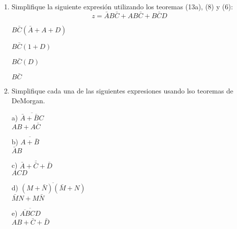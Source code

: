 \documentclass[a4paper, 12pt]{article}
\newcommand{\Aspace}{0.2cm}
\begin{document}
\begin{enumerate}
        
        \item Simplifique la siguiente expresión utilizando los teoremas (13a), (8) y (6):
        \[ z = \bar{A}B\bar{C} + AB\bar{C} + B\bar{C}D \]
            \par
            { \color{azul} 
                        $B\bar{C}(\bar{A} + A + D)$
                \par    $B\bar{C}(1 + D)$
                \par    $B\bar{C}(D)$
                \par    $B\bar{C}$
            }



        \item Simplifique cada una de las siguientes expresiones usando lso teoremas de DeMorgan.
            \vspace{\Aspace} \par
            a) $\overline{\bar{A} + \bar{B}C}$
            \\ { \color{azul} $AB + A\bar{C}$ }

            \vspace{\Aspace} \par
            b) $\overline{A + \bar{B}}$
            \\ { \color{azul} $\bar{A}B$ }

            \vspace{\Aspace} \par
            c) $\overline{\bar{A} + \bar{C} + \bar{D}}$
            \\ { \color{azul} $ACD$ }

            \vspace{\Aspace} \par
            d) $\overline{(M + \bar{N})(\bar{M} + N)}$
            \\ { \color{azul} $\bar{M}N + M\bar{N}$ }

            \vspace{\Aspace} \par
            e) $\overline{\overline{AB}CD}$
            \\ { \color{azul} $AB + \bar{C} + \bar{D}$ }



\end{enumerate}
\end{document}

